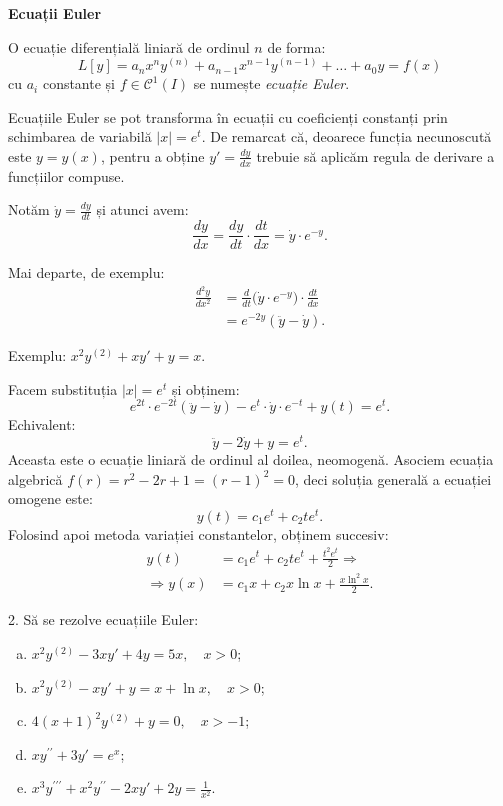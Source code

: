 \documentclass[11pt,a4paper]{article}
\newcommand\kal{\mathcal}
\theoremstyle{dotless}
\theoremstyle{dotlessdr}
\begin{document}
\vspace{1cm}



\textbf{Ecuații Euler}

O ecuație diferențială liniară de ordinul $n$ de forma:
\[
  L[y] = a_n x^n y^{(n)} + a_{n-1} x^{n-1} y^{(n-1)} + \dots + a_0 y = f(x)
\]
cu $a_i$ constante și $f \in \kal{C}^1(I)$ se numește \emph{ecuație Euler}.


Ecuațiile Euler se pot transforma în ecuații cu coeficienți constanți prin schimbarea
de variabilă $|x| = e^t$. De remarcat că, deoarece funcția necunoscută este $y = y(x)$,
pentru a obține $y' = \frac{dy}{dx}$ trebuie să aplicăm regula de derivare a funcțiilor compuse.

Notăm $\dot{y} = \frac{dy}{dt}$ și atunci avem:
\[
  \frac{dy}{dx} = \frac{dy}{dt} \cdot \frac{dt}{dx} = \dot{y} \cdot e^{-y}.
\]

Mai departe, de exemplu:
\begin{align*}
  \frac{d^2 y}{dx^2} &= \frac{d}{dt} \Big( \dot{y} \cdot e^{-y} \Big) \cdot \frac{dt}{dx} \\
                     &= e^{-2y}(\ddot{y} - \dot{y}).
\end{align*}


Exemplu: $x^2 y^{(2)} + xy' + y = x$.

Facem substituția $|x| = e^t$ și obținem:
\[
  e^{2t} \cdot e^{-2t}(\ddot{y} - \dot{y}) - e^t \cdot \dot{y} \cdot e^{-t} + y(t) = e^t.
\]
Echivalent:
\[
  \ddot{y} - 2\dot{y} + y = e^t.
\]
Aceasta este o ecuație liniară de ordinul al doilea, neomogenă. Asociem ecuația
algebrică $f(r) = r^2 - 2r + 1 = (r - 1)^2 = 0$, deci soluția generală a ecuației
omogene este:
\[
  y(t) = c_1 e^t + c_2 te^t.
\]
Folosind apoi metoda variației constantelor, obținem succesiv:
\begin{align*}
  y(t) &= c_1 e^t + c_2te^t + \frac{t^2 e^t}{2} \Rightarrow \\
  \Rightarrow y(x) &= c_1 x + c_2 x \ln x + \frac{x\ln^2 x}{2}.
\end{align*}

\vspace{1cm}

2. Să se rezolve ecuațiile Euler:
\begin{enumerate}[(a)]
\item $x^2 y^{(2)} - 3xy' + 4y = 5x, \quad x > 0$;
\item $x^2 y^{(2)} - xy' + y = x + \ln x, \quad x > 0$;
\item $4(x + 1)^2 y^{(2)} + y = 0, \quad x > -1$;
\item $xy^{\prime\prime} + 3y' = e^x$;
\item $x^3 y^{\prime\prime\prime} + x^2y^{\prime\prime} - 2xy' + 2y = \frac{1}{x^2}$.
\end{enumerate}
\end{document}
